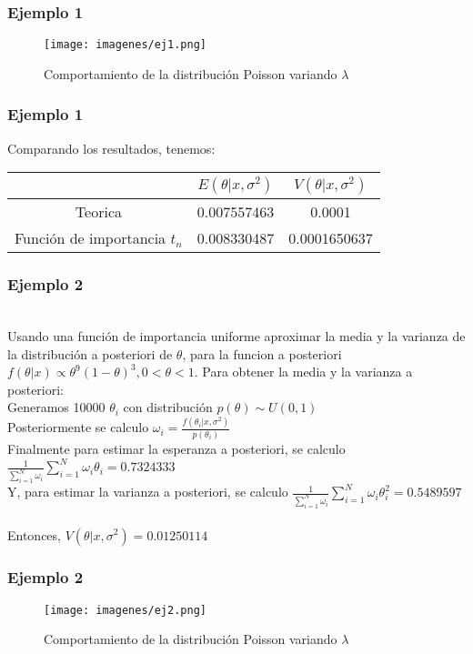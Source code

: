 \documentclass[12pt]{beamer}
\begin{document}
\begin{frame}
\frametitle{Ejemplo 1}
\begin{figure}[!h]
    \begin{center}
        \texttt{[image: imagenes/ej1.png]}
        \caption{Comportamiento de la distribución Poisson variando $\lambda$}
        \label{fig:Densidad}
    \end{center}
\end{figure}
\end{frame}

\begin{frame}
\frametitle{Ejemplo 1}
Comparando los resultados, tenemos:
\begin{tabular}{|c|c|c|}
\hline 
 & $E(\theta|x,\sigma^2)$ & $V(\theta|x,\sigma^2)$ \\ 
\hline 
Teorica & 0.007557463 & 0.0001 \\ 
Función de importancia $t_{n}$ &  0.008330487 & 0.0001650637 \\ 
\hline 
\end{tabular} 
\end{frame}

\begin{frame}
\frametitle{Ejemplo 2}
~\\ Usando una función de importancia uniforme aproximar la media y la varianza de la distribución a posteriori de $\theta$, para la funcion a posteriori $f(\theta|x)\propto \theta^9(1-\theta)^3, 0<\theta<1$. Para obtener la media y la varianza a posteriori:
~\\Generamos 10000 $\theta_{i}$ con distribución $p(\theta)\sim U(0,1)$
~\\Posteriormente se calculo $\omega_{i}=\frac{f(\theta_{i}|x,\sigma^2)}{p(\theta_{i})}$
~\\Finalmente para estimar la esperanza a posteriori, se calculo $\frac{1}{\sum\limits_{i=1}^{N}\omega_{i}}\sum\limits_{i=1}^{N}\omega_{i}\theta_{i}=0.7324333$
~\\Y, para estimar la varianza a posteriori, se calculo $\frac{1}{\sum\limits_{i=1}^{N}\omega_{i}}\sum\limits_{i=1}^{N}\omega_{i}\theta_{i}^2=0.5489597$
~\\Entonces, $V(\theta|x,\sigma^2)=0.01250114$
\end{frame}

\begin{frame}
\frametitle{Ejemplo 2}
\begin{figure}[!h]
    \begin{center}
        \texttt{[image: imagenes/ej2.png]}
        \caption{Comportamiento de la distribución Poisson variando $\lambda$}
        \label{fig:Densidad}
    \end{center}
\end{figure}
\end{frame}
\end{document}
